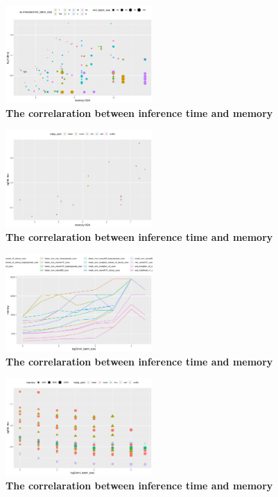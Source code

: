 \documentclass[conference]{IEEEtran}
\begin{document}
\begin{figure}[htpb]
	  \centering
	  \includegraphics[width=0.5\textwidth]{MemoryVSRunning-Batch}
	  \caption{\textbf{The correlaration between inference time and memory}}
	  \label{fig:memory-running-batch}
\end{figure}


\begin{figure}[htpb]
	  \centering
	  \includegraphics[width=0.5\textwidth]{MemoryVSRunning-Meta}
	  \caption{\textbf{The correlaration between inference time and memory}}
	  \label{fig:memory-running-meta}
\end{figure}

\begin{figure}[htpb]
	  \centering
	  \includegraphics[width=0.5\textwidth]{MemoryVSBatch}
	  \caption{\textbf{The correlaration between inference time and memory}}
	  \label{fig:memory-batch}
\end{figure}

\begin{figure}[htpb]
	  \centering
	  \includegraphics[width=0.5\textwidth]{RunningTimeVSBatch}
	  \caption{\textbf{The correlaration between inference time and memory}}
	  \label{fig:running-batch}
\end{figure}
\end{document}
